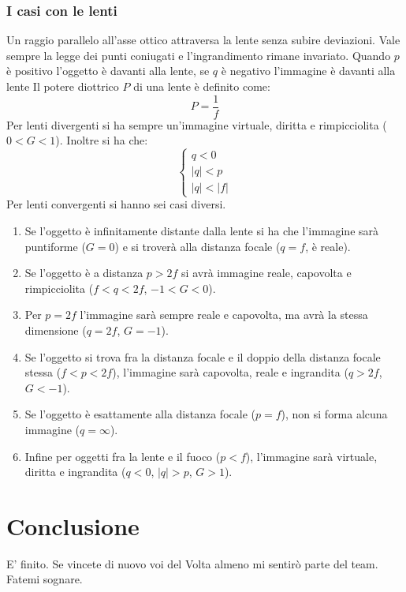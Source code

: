 \documentclass{article}
\begin{document}
\subsubsection{I casi con le lenti}
Un raggio parallelo all'asse ottico attraversa la lente senza subire deviazioni. Vale sempre la legge dei punti coniugati e l'ingrandimento rimane invariato.
Quando $p$ è positivo l'oggetto è davanti alla lente, se $q$ è negativo l'immagine è davanti alla lente
Il potere diottrico $P$ di una lente è definito come:
\begin{equation}
    P=\frac{1}{f}
\end{equation}
Per lenti divergenti si ha sempre un'immagine virtuale, diritta e rimpicciolita ($0<G<1$). Inoltre si ha che:
\begin{equation}
    \begin{cases}
        q<0\\
        |q|<p\\
        |q|<|f|
    \end{cases}
\end{equation}
Per lenti convergenti si hanno sei casi diversi.
\begin{enumerate}
    \item Se l'oggetto è infinitamente distante dalla lente si ha che l'immagine sarà puntiforme ($G=0$) e si troverà alla distanza focale ($q=f$, è reale).
    \item Se l'oggetto è a distanza $p>2f$ si avrà immagine reale, capovolta e rimpicciolita ($f<q<2f$, $-1<G<0$).
    \item Per $p=2f$ l'immagine sarà sempre reale e capovolta, ma avrà la stessa dimensione ($q=2f$, $G=-1$).
    \item Se l'oggetto si trova fra la distanza focale e il doppio della distanza focale stessa ($f<p<2f$), l'immagine sarà capovolta, reale e ingrandita ($q>2f$, $G<-1$).
    \item Se l'oggetto è esattamente alla distanza focale ($p=f$), non si forma alcuna immagine ($q=\infty$).
    \item Infine per oggetti fra la lente e il fuoco ($p<f$), l'immagine sarà virtuale, diritta e ingrandita ($q<0$, $|q|>p$, $G>1$).
\end{enumerate}




\section*{Conclusione} 
E' finito. Se vincete di nuovo voi del Volta almeno mi sentirò parte del team. Fatemi sognare. 
\end{document}
